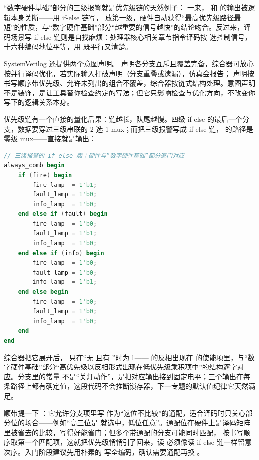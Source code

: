 
“数字硬件基础”部分的三级报警就是优先级链的天然例子： 一来， 和  的输出被逻辑本身关断——用 if-else 链写， 放第一级，硬件自动获得“最高优先级路径最短”的性质，与“数字硬件基础”部分“越重要的信号越快”的结论吻合。反过来，译码场景写 if-else 链则是自找麻烦：处理器核心相关章节指令译码按  选控制信号，十六种编码地位平等，用  既平行又清楚。

SystemVerilog 还提供两个意图声明。 声明各分支互斥且覆盖完备，综合器可放心按并行译码优化，若实际输入打破声明（分支重叠或遗漏），仿真会报告； 声明按书写顺序带优先级、允许未列出的组合不覆盖，综合器按链式结构处理。意图声明不是装饰，是让工具替你检查约定的写法；但它只影响检查与优化方向，不改变你写下的逻辑关系本身。

优先级链有一个直接的量化后果：链越长，队尾越慢。四级 if-else 的最后一个分支，数据要穿过三级串联的 2 选 1 mux；而把三级报警写成 if-else 链， 的路径是零级 mux——直接就是输出：

\begin{lstlisting}[language=Verilog]
// 三级报警的 if-else 版：硬件与“数字硬件基础”部分逐门对应
always_comb begin
    if (fire) begin
        fire_lamp  = 1'b1;
        fault_lamp = 1'b0;
        info_lamp  = 1'b0;
    end else if (fault) begin
        fire_lamp  = 1'b0;
        fault_lamp = 1'b1;
        info_lamp  = 1'b0;
    end else if (info) begin
        fire_lamp  = 1'b0;
        fault_lamp = 1'b0;
        info_lamp  = 1'b1;
    end else begin
        fire_lamp  = 1'b0;
        fault_lamp = 1'b0;
        info_lamp  = 1'b0;
    end
end
\end{lstlisting}

综合器把它展开后， 只在“无  且有 ”时为 1—— 的反相出现在  的使能项里，与“数字硬件基础”部分“高优先级以反相形式出现在低优先级乘积项中”的结构逐字对应。分支里的常量  不是“关灯动作”，是把对应输出接到固定电平；三个输出在每条路径上都有确定值，这段代码不会推断锁存器，下一专题的默认值纪律它天然满足。

顺带提一下 ：它允许分支项里写  作为“这位不比较”的通配，适合译码时只关心部分位的场合——例如“高三位是  就选中，低位任意”。通配位在硬件上是译码矩阵里被省去的比较，写得好能省门；但多个带通配的分支可能同时匹配， 按书写顺序取第一个匹配项，这就把优先级悄悄引了回来，读  必须像读 if-else 链一样留意次序。入门阶段建议先用朴素的  写全编码，确认需要通配再换 。

